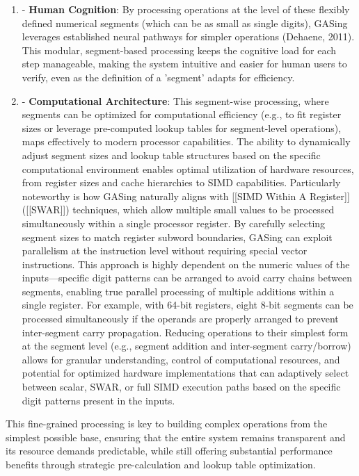 \begin{enumerate}
  \item - \textbf{Human Cognition}: By processing operations at the level of these flexibly defined numerical segments (which can be as small as single digits), GASing leverages established neural pathways for simpler operations (Dehaene, 2011). This modular, segment-based processing keeps the cognitive load for each step manageable, making the system intuitive and easier for human users to verify, even as the definition of a 'segment' adapts for efficiency.
  \item - \textbf{Computational Architecture}: This segment-wise processing, where segments can be optimized for computational efficiency (e.g., to fit register sizes or leverage pre-computed lookup tables for segment-level operations), maps effectively to modern processor capabilities. The ability to dynamically adjust segment sizes and lookup table structures based on the specific computational environment enables optimal utilization of hardware resources, from register sizes and cache hierarchies to SIMD capabilities. Particularly noteworthy is how GASing naturally aligns with [[SIMD Within A Register]] ([[SWAR]]) techniques, which allow multiple small values to be processed simultaneously within a single processor register. By carefully selecting segment sizes to match register subword boundaries, GASing can exploit parallelism at the instruction level without requiring special vector instructions. This approach is highly dependent on the numeric values of the inputs—specific digit patterns can be arranged to avoid carry chains between segments, enabling true parallel processing of multiple additions within a single register. For example, with 64-bit registers, eight 8-bit segments can be processed simultaneously if the operands are properly arranged to prevent inter-segment carry propagation. Reducing operations to their simplest form at the segment level (e.g., segment addition and inter-segment carry/borrow) allows for granular understanding, control of computational resources, and potential for optimized hardware implementations that can adaptively select between scalar, SWAR, or full SIMD execution paths based on the specific digit patterns present in the inputs.
\end{enumerate}

This fine-grained processing is key to building complex operations from the simplest possible base, ensuring that the entire system remains transparent and its resource demands predictable, while still offering substantial performance benefits through strategic pre-calculation and lookup table optimization.

